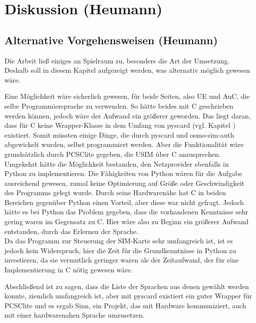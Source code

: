 \clearpage

\section{Diskussion (Heumann)}
\label{diskussion}

	\subsection{Alternative Vorgehensweisen (Heumann)}
	\label{diskussion-alternative}
	
	Die Arbeit ließ einiges an Spielraum zu, besonders die Art der Umsetzung. Deshalb soll in
	diesem Kapitel aufgezeigt werden, was alternativ möglich gewesen wäre.
	
	Eine Möglichkeit wäre sicherlich gewesen, für beide Seiten, also UE und AuC, die selbe
	Programmiersprache zu verwenden. So hätte beides mit C geschrieben werden können,
	jedoch wäre der Aufwand ein größerer geworden. Das liegt daran, dass für C keine
	Wrapper-Klasse in dem Umfang von pyscard (vgl. Kapitel ) existiert.
	Somit müssten einige Dinge, die durch pyscard und osmo-sim-auth abgewickelt wurden,
	selbst programmiert werden. Aber die Funktionalität wäre grundsätzlich durch PCSClite
	gegeben, die USIM über C anzusprechen. \\
	Umgekehrt hätte die Möglichkeit bestanden, den Netzprovider ebenfalls in Python zu
	implementieren. Die Fähigkeiten von Python wären für die Aufgabe ausreichend gewesen,
	zumal keine Optimierung auf Größe oder Geschwindigkeit des Programms gelegt wurde.
	Durch seine Hardwarenähe hat C in beiden Bereichen gegenüber Python einen Vorteil,
	aber diese war nicht gefragt. Jedoch hätte es bei Python das Problem gegeben, dass
	die vorhandenen Kenntnisse sehr gering waren im Gegensatz zu C. Hier wäre also zu Beginn
	ein größerer Aufwand entstanden, durch das Erlernen der Sprache. \\
	Da das Programm zur Steuerung der SIM-Karte sehr umfangreich ist, ist es jedoch kein Widerspruch,
	hier die Zeit für die Grundkenntnisse in Python zu investieren, da sie vermutlich geringer
	waren als der Zeitaufwand, der für eine Implementierung in C nötig gewesen wäre.
	
	Abschließend ist zu sagen, dass die Liste der Sprachen aus denen gewählt werden konnte,
	ziemlich umfangreich ist, aber mit pyscard existiert ein guter Wrapper für PCSClite und
	es ergab Sinn, ein Projekt, das mit Hardware kommuniziert, auch mit einer hardwarenahen
	Sprache umzusetzen.	
	
